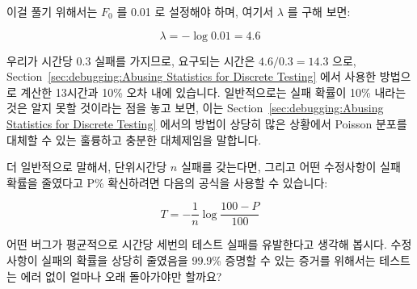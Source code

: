 이걸 풀기 위해서는 $F_0$ 를 0.01 로 설정해야 하며, 여기서 $\lambda$ 를 구해
보면:

\begin{equation}
	\lambda = - \log 0.01 = 4.6
\end{equation}

우리가 시간당 $0.3$ 실패를 가지므로, 요구되는 시간은 $4.6/0.3 = 14.3$ 으로,
Section~\ref{sec:debugging:Abusing Statistics for Discrete Testing} 에서 사용한
방법으로 계산한 13시간과 10\% 오차 내에 있습니다.
일반적으로는 실패 확률이 10\% 내라는 것은 알지 못할 것이라는 점을 놓고 보면,
이는
Section~\ref{sec:debugging:Abusing Statistics for Discrete Testing} 에서의
방법이 상당히 많은 상황에서 Poisson 분포를 대체할 수 있는 훌륭하고 충분한
대체제임을 말합니다.

더 일반적으로 말해서, 단위시간당 $n$ 실패를 갖는다면, 그리고 어떤 수정사항이
실패 확률을 줄였다고 P\% 확신하려면 다음의 공식을 사용할 수 있습니다:

\begin{equation}
	T = - \frac{1}{n} \log \frac{100 - P}{100}
\label{eq:debugging:Error-Free Test Duration}
\end{equation}

\QuickQuiz{}
	어떤 버그가 평균적으로 시간당 세번의 테스트 실패를 유발한다고 생각해
	봅시다.
	수정사항이 실패의 확률을 상당히 줄였음을 99.9\% 증명할 수 있는 증거를
	위해서는 테스트는 에러 없이 얼마나 오래 돌아가야만 할까요?
	\iffalse

